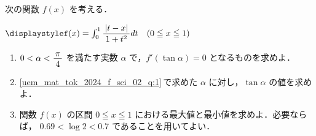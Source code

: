 ﻿\documentclass[../../../uem_mat_tok_q.tex]{subfiles}
\begin{document}
    次の関数 $f(x)$ を考える．
    
    \myspaceb
    $\displaystyle%
        f(x)=\int_0^1\myfraca{|t-x|}{1+t^2}dt\quad(0\leqq x\leqq 1)%
    $

    \begin{enumerate}
        \item $0<\alpha<\myfraca{\pi}{4}$ を満たす実数 $\alpha$ で，$f'(\tan\alpha)=0$ となるものを求めよ．
            \label{uem_mat_tok_2024_f_sci_02_q:1}
        \item \ref{uem_mat_tok_2024_f_sci_02_q:1}\,で求めた $\alpha$ に対し，$\tan\alpha$ の値を求めよ．
        \item 関数 $f(x)$ の区間 $0\leqq x\leqq 1$ における最大値と最小値を求めよ．必要ならば，%
            $0.69<\log 2<0.7$ であることを用いてよい．
    \end{enumerate}
\end{document}
